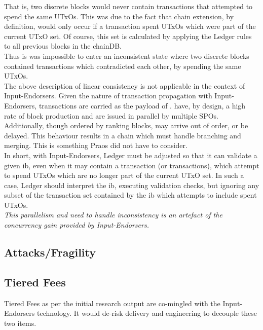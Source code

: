 \documentclass[11pt,a4paper]{article}
\begin{document}
That is, two discrete blocks would never contain transactions that attempted to spend the same UTxOs. This was due 
to the fact that chain extension, by definition, would only occur if a transaction spent UTxOs which were part of the 
current UTxO set. Of course, this set is calculated by applying the Ledger rules to all previous blocks in the 
chainDB.\\

Thus is was impossible to enter an inconsistent state where two discrete blocks contained transactions which 
contradicted each other, by spending the same UTxOs. \\

The above description of linear consistency is not applicable in the context of Input-Endorsers. Given the nature of 
transaction propagation with Input-Endorsers, transactions are carried as the payload of . 
have, by design, a high rate of block production and are issued in parallel by multiple SPOs. Additionally, 
 though ordered by ranking blocks, may arrive out of order, or be delayed. This behaviour results in a 
chain which must handle branching and merging. This is something Praos did not have to consider. \\

In short, with Input-Endorsers, Ledger must be adjusted so that it can validate a given \gls{ib}, even when it may 
contain a transaction (or transactions), which attempt to spend UTxOs which are no longer part of the current UTxO set.
In such a case, Ledger should interpret the \gls{ib}, executing validation checks, but ignoring any subset of the 
transaction set contained by the \gls{ib} which attempts to include spent UTxOs. \\

\emph{This parallelism and need to handle inconsistency is an artefact of the concurrency gain provided by 
Input-Endorsers.}


\subsection{Attacks/Fragility}

\subsection{Tiered Fees}
Tiered Fees as per the initial research output are co-mingled with the Input-Endorsers technology.
It would de-risk delivery and engineering to decouple these two items.
\end{document}
